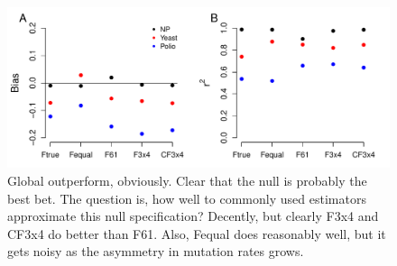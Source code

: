 \documentclass{pnastwo}
\begin{document}
\bigskip
\begin{figure}[H]
\centerline{\includegraphics[width=6in]{figures/MainText/nyp_bias_r2.pdf}}
\caption{\label{nyp_bias_r2} Global outperform, obviously. Clear that the null is probably the best bet. The question is, how well to commonly used estimators approximate this null specification? Decently, but clearly F3x4 and CF3x4 do better than F61. Also, Fequal does reasonably well, but it gets noisy as the asymmetry in mutation rates grows.}
\end{figure}
\end{document}
